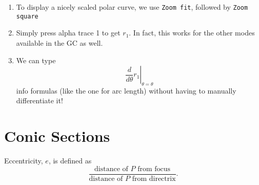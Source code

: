 \documentclass[oneside]{book}
\begin{document}
\begin{GCSkills}{}
  \begin{enumerate}
    \item To display a nicely scaled polar curve, we use \texttt{Zoom fit}, followed by \texttt{Zoom square}
    \item Simply press alpha trace 1 to get \(r_1\). In fact, this works for the other modes available in the GC as well. 
    \item We can type 
    \[\left. \frac{d}{d\theta}r_1 \right\rvert_{\theta=\theta}\] 
    info formulas (like the one for arc length) without having to manually differentiate it!
  \end{enumerate}
\end{GCSkills}

\chapter{Conic Sections}
\begin{definition}{}{}
  Eccentricity, \(e\), is defined as 
  \[\frac{\text{distance of \(P\) from focus}}{\text{distance of \(P\) from directrix}}.\]
\end{definition}
\end{document}
